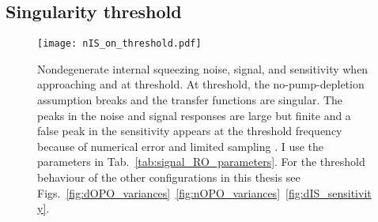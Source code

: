 
\subsection{Singularity threshold}
\label{sec:singularity_threshold}


\begin{figure}
    \centering
    \texttt{[image: nIS\_on\_threshold.pdf]}
    \caption{ Nondegenerate internal squeezing noise, signal, and sensitivity when approaching and at threshold. At threshold, the no-pump-depletion assumption breaks and the transfer functions are singular. The peaks in the noise and signal responses are large but finite and a false peak in the sensitivity appears at the threshold frequency because of numerical error and limited sampling . I use the parameters in Tab.~\ref{tab:signal_RO_parameters}. For the threshold behaviour of the other configurations in this thesis see Figs.~\ref{fig:dOPO_variances}~\ref{fig:nOPO_variances}~\ref{fig:dIS_sensitivity}.}
    \label{fig:nIS_on_threshold}
\end{figure}


